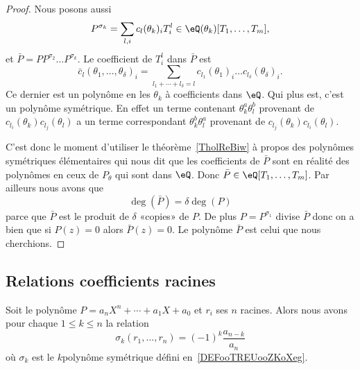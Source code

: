 \begin{proof}
	Nous posons aussi
	\begin{equation}
		P^{\sigma_k}=\sum_{l,i} c_l(\theta_k)_iT_i^l\in \eQ(\theta_k)[T_1,\ldots, T_m],
	\end{equation}
	et \( \bar P=PP^{\sigma_2}\ldots P^{\sigma_k}\). Le coefficient de \( T_i^l\) dans \( \bar P\) est
	\begin{equation}
		\bar c_l(\theta_1,\ldots, \theta_{\delta})_i=\sum_{l_1+\cdots +l_{\delta}=l}c_{l_1}(\theta_1)_i\ldots c_{l_{\delta}}(\theta_{\delta})_i.
	\end{equation}
	Ce dernier est un polynôme en les \( \theta_k\) à coefficients dans \( \eQ\). Qui plus est, c'est un polynôme symétrique. En effet un terme contenant \( \theta_k^a\theta_l^b\) provenant de \( c_{l_i}(\theta_k)c_{l_j}(\theta_l)\) a un terme correspondant \( \theta_k^b\theta_l^a\) provenant de \( c_{l_j}(\theta_k)c_{l_i}(\theta_l)\).

	C'est donc le moment d'utiliser le théorème~\ref{TholReBiw} à propos des polynômes symétriques élémentaires qui nous dit que les coefficients de \( \bar P\) sont en réalité des polynômes en ceux de \( P_{\theta}\) qui sont dans \( \eQ\). Donc \( \bar P\in \eQ[T_1,\ldots, T_m]\). Par ailleurs nous avons que
	\begin{equation}
		\deg(\bar P)=\delta \deg(P)
	\end{equation}
	parce que \( \bar P\) est le produit de \( \delta\) «copies»  de \( P\). De plus \( P=P^{\sigma_1}\) divise \( \bar P \) donc on a bien que si \( P(z)=0\) alors \( \bar P(z)=0\). Le polynôme \( \bar P\) est celui que nous cherchions.
\end{proof}

\subsection{Relations coefficients racines}

\begin{theorem} \label{ThoOQRgjpl}
	Soit le polynôme \( P=a_nX^n+\cdots +a_1X+a_0\) et \( r_i\) ses \( n\) racines. Alors nous avons pour chaque \( 1\leq k\leq n\) la relation
	\begin{equation}
		\sigma_k(r_1,\ldots, r_n)=(-1)^k\frac{ a_{n-k} }{ a_n }
	\end{equation}
	où \( \sigma_k\) est le \( k\)\ieme polynôme symétrique défini en~\ref{DEFooTREUooZKoXeg}.
\end{theorem}

